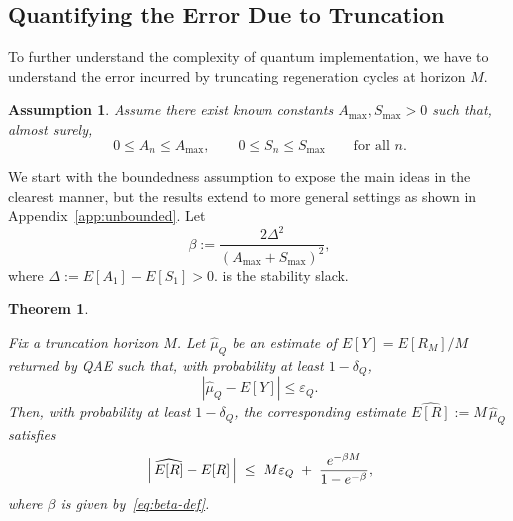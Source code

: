 \documentclass[11pt]{article}
\newtheorem{assumption}{Assumption}
\newtheorem{theorem}{Theorem}
\begin{document}
\subsection{Quantifying the Error Due to Truncation}
\label{sec:error-trunc-norm}

To further understand the complexity of quantum implementation, we have to understand the error incurred by
truncating regeneration cycles at horizon $M$.

\begin{assumption}\label{ass:bounded increments}
Assume there exist known constants $A_{\max},S_{\max}>0$ such that, almost surely,
\[
0 \le A_n \le A_{\max},\qquad 0 \le S_n \le S_{\max}\qquad\text{for all }n.
\]
\end{assumption}

We start with the boundedness assumption to expose the main ideas in the clearest manner, but the results extend to more general settings as shown in Appendix~\ref{app:unbounded}.
Let
\begin{equation}
\label{eq:beta-def}
\beta := \frac{2\Delta^2}{(A_{\max}+S_{\max})^2},
\end{equation}
where
$
\Delta := E[A_1]-E[S_1] > 0.
$ is the stability slack.

\begin{theorem}
\label{thm:ER-error-bounded}

Fix a truncation horizon $M$. Let $\hat{\mu}_Q$
be an estimate of $E[Y]=E[R_M]/M$ returned by QAE
such that, with probability at least $1-\delta_Q$,
\begin{equation}
\label{eq:qae-err-bounded}
|\hat{\mu}_Q - E[Y]|
\le \varepsilon_Q.
\end{equation}
Then, with probability at least $1-\delta_Q$, the corresponding estimate
$\widehat{E[R]} := M\,\hat{\mu}_Q$ satisfies
\begin{equation}
\label{eq:ER-bound-bounded}
\Bigl|\,\widehat{E[R]} - E[R]\,\Bigr|
\;\le\;
M\varepsilon_Q
\;+\;
\frac{e^{-\beta M}}{1-e^{-\beta}},
\end{equation}
where $\beta$ is given by~\eqref{eq:beta-def}.
\end{theorem}
\end{document}
